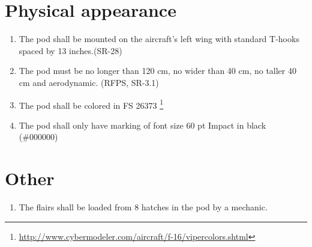 \documentclass[Main]{subfiles}
\begin{document}
\section{Physical appearance}
\begin{enumerate}[label=\bfseries DDD-5.\arabic*:]

\item The pod shall be mounted on the aircraft's left wing with standard T-hooks spaced by 13 inches.(SR-28)

\item The pod must be no longer than 120 cm, no wider than 40 cm, no taller 40 cm and aerodynamic. (RFPS, SR-3.1)

\item The pod shall be colored in FS 26373 \footnote{\url{http://www.cybermodeler.com/aircraft/f-16/vipercolors.shtml}}

\item The pod shall only have marking of font size 60 pt Impact in black (\#000000)

\end{enumerate}


\section{Other}

\begin{enumerate}[label=\bfseries DDD-6.\arabic*:]

\item The flairs shall be loaded from 8 hatches in the pod by a mechanic.

\end{enumerate}
\end{document}
